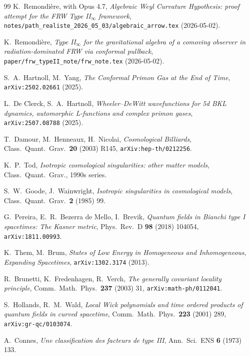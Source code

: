 \documentclass[11pt]{article}
\theoremstyle{definition}
\begin{document}

\begin{thebibliography}{99}
 K.~Remondi\`ere, with Opus 4.7,
\emph{Algebraic Weyl Curvature Hypothesis: proof attempt for the FRW
Type II$_\infty$ framework},
\texttt{notes/path\_realiste\_2026\_05\_03/algebraic\_arrow.tex} (2026-05-02).

 K.~Remondi\`ere, \emph{Type II$_\infty$ for the
gravitational algebra of a comoving observer in radiation-dominated FRW
via conformal pullback},
\texttt{paper/frw\_typeII\_note/frw\_note.tex} (2026-05-02).

 S.~A.~Hartnoll, M.~Yang,
\emph{The Conformal Primon Gas at the End of Time},
\texttt{arXiv:2502.02661} (2025).

 L.~De Clerck, S.~A.~Hartnoll,
\emph{Wheeler--DeWitt wavefunctions for 5d BKL dynamics, automorphic
L-functions and complex primon gases}, \texttt{arXiv:2507.08788} (2025).

 T.~Damour, M.~Henneaux, H.~Nicolai,
\emph{Cosmological Billiards}, Class.\ Quant.\ Grav.\ \textbf{20}
(2003) R145, \texttt{arXiv:hep-th/0212256}.

 K.~P.~Tod, \emph{Isotropic cosmological
singularities: other matter models}, Class.\ Quant.\ Grav., 1990s
series.

 S.~W.~Goode, J.~Wainwright,
\emph{Isotropic singularities in cosmological models}, Class.\ Quant.\
Grav.\ \textbf{2} (1985) 99.

 G.~Pereira, E.~R.~Bezerra de Mello, I.~Brevik,
\emph{Quantum fields in Bianchi type I spacetimes: The Kasner metric},
Phys.\ Rev.\ D \textbf{98} (2018) 104054, \texttt{arXiv:1811.00993}.

 K.~Them, M.~Brum, \emph{States of Low Energy in
Homogeneous and Inhomogeneous, Expanding Spacetimes},
\texttt{arXiv:1302.3174} (2013).

 R.~Brunetti, K.~Fredenhagen,
R.~Verch, \emph{The generally covariant locality principle}, Comm.\
Math.\ Phys.\ \textbf{237} (2003) 31, \texttt{arXiv:math-ph/0112041}.

\bibitem{HollandsWald2001} S.~Hollands, R.~M.~Wald, \emph{Local Wick
polynomials and time ordered products of quantum fields in curved
spacetime}, Comm.\ Math.\ Phys.\ \textbf{223} (2001) 289,
\texttt{arXiv:gr-qc/0103074}.

 A.~Connes, \emph{Une classification des facteurs
de type III}, Ann.\ Sci.\ ENS \textbf{6} (1973) 133.


\end{thebibliography}
\end{document}
